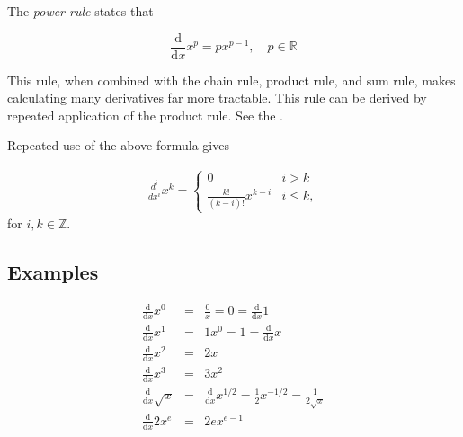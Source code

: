 \documentclass[12pt]{article}
\newcommand{\D}[1]{\ensuremath{\mathrm{d}#1}}
\newcommand{\DDX}{\ensuremath{\frac{\D{}}{\D{x}}}}
\begin{document}
The \emph{power rule} states that

\begin{equation*}
\DDX x^p = px^{p-1}, \quad p \in \mathbb{R}
\end{equation*}

This rule, when combined with the chain rule, product rule, and sum rule,
makes calculating many derivatives far more tractable.  This rule can be derived by repeated application of the product rule.
See the .

Repeated use of the above formula gives

\begin{align*}
\frac{d^i}{dx^i}x^k=
\begin{cases}
0&i>k\\
\frac{k!}{(k-i)!}x^{k-i}&i\leq k,
\end{cases}
\end{align*}
for $i,k\in\mathbb{Z}$.

\subsection*{Examples}

\begin{eqnarray*}
\DDX x^0 & = & \frac{0}{x} = 0 = \DDX 1 \\
\DDX x^1 & = & 1x^0 = 1 = \DDX x \\
\DDX x^2 & = & 2x \\
\DDX x^3 & = & 3x^2 \\
\DDX \sqrt{x} & = & \DDX x^{1/2} = \frac{1}{2}x^{-1/2} = \frac{1}{2\sqrt{x}} \\
\DDX 2x^e & = & 2ex^{e-1}
\end{eqnarray*}
\end{document}
